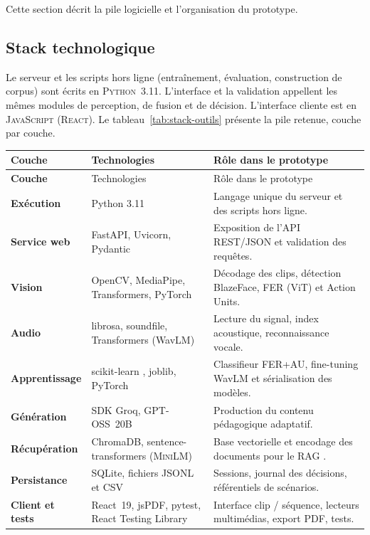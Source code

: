 Cette section décrit la pile logicielle et l'organisation du prototype.

\subsection{Stack technologique}
\label{subsec:stack}

Le serveur et les scripts hors ligne (entraînement, évaluation,
construction de corpus) sont écrits en \textsc{Python}~3.11.
L'interface et la validation appellent les mêmes modules de
perception, de fusion et de décision. L'interface cliente est en
\textsc{JavaScript} (\textsc{React}).
Le tableau~\ref{tab:stack-outils} présente la pile retenue, couche par couche.

{\small
\renewcommand{\arraystretch}{1.18}
\setlength{\tabcolsep}{4pt}
\begin{xltabular}{\textwidth}{|>{\bfseries}l|>{\raggedright\arraybackslash}X|>{\raggedright\arraybackslash}X|}
\hline
{}
Couche & Technologies & Rôle dans le prototype \\
\hline
\endfirsthead
\hline
{}
Couche & Technologies & Rôle dans le prototype \\
\hline
\endhead
\endfoot
\endlastfoot
Exécution & Python 3.11 &
Langage unique du serveur et des scripts hors ligne. \\
\hline
Service web & FastAPI, Uvicorn, Pydantic &
Exposition de l'API REST/JSON et validation des requêtes. \\
\hline
Vision & OpenCV, MediaPipe, Transformers, PyTorch &
Décodage des clips, détection BlazeFace, FER (ViT) et Action Units. \\
\hline
Audio & librosa, soundfile, Transformers (WavLM) &
Lecture du signal, index acoustique, reconnaissance vocale. \\
\hline
Apprentissage & scikit-learn \cite{pedregosa2011scikit}, joblib, PyTorch &
Classifieur FER+AU, fine-tuning WavLM et sérialisation des modèles. \\
\hline
Génération & SDK Groq, \textsc{GPT-OSS}~20B &
Production du contenu pédagogique adaptatif. \\
\hline
Récupération & ChromaDB, sentence-transformers (\textsc{MiniLM}) \cite{wang2020minilm} &
Base vectorielle et encodage des documents pour le RAG
\cite{lewis2020retrieval,gao2023retrieval}. \\
\hline
Persistance & SQLite, fichiers JSONL et CSV &
Sessions, journal des décisions, référentiels de scénarios. \\
\hline
Client et tests & React~19, jsPDF, pytest, React Testing Library &
Interface clip / séquence, lecteurs multimédias, export PDF, tests. \\
\hline
\end{xltabular}
\label{tab:stack-outils}
}


